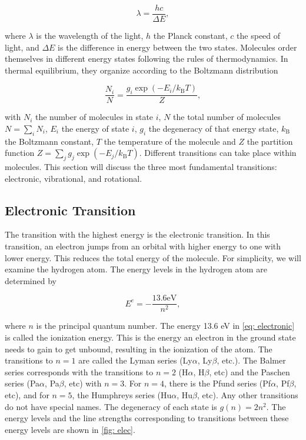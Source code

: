 \documentclass[oneside, single, authoryear, semicolon, 12pt]{lion-msc}
\newcommand{\4}{$_4$}
\newcommand{\3}{$_3$}
\newcommand{\2}{$_2$}
\begin{document}
\begin{equation}
    \lambda=\frac{hc}{\Delta E},
\end{equation}

where $\lambda$ is the wavelength of the light, $h$ the Planck constant, $c$ the speed of light, and $\Delta E$ is the difference in energy between the two states. Molecules order themselves in different energy states following the rules of thermodynamics. In thermal equilibrium, they organize according to the Boltzmann distribution 

\begin{equation}
    \frac{N_i}{N}=\frac{g_i\exp{(-E_i/k_\mathrm{B}T)}}{Z},
    \label{eq: boltzmann}
\end{equation}

with $N_i$ the number of molecules in state $i$, $N$ the total number of molecules $N=\sum_iN_i$, $E_i$ the energy of state $i$, $g_i$ the degeneracy of that energy state, $k_\mathrm{B}$ the Boltzmann constant, $T$ the temperature of the molecule and $Z$ the partition function $Z=\sum_j g_j\exp{(-E_j/k_\mathrm{B}T)}$.
Different transitions can take place within molecules. This section will discuss the three most fundamental transitions: electronic, vibrational, and rotational.

\subsection{Electronic Transition}
The transition with the highest energy is the electronic transition. In this transition, an electron jumps from an orbital with higher energy to one with lower energy. This reduces the total energy of the molecule. For simplicity, we will examine the hydrogen atom. The energy levels in the hydrogen atom are determined by

\begin{equation}
    E^e=-\frac{13.6\mathrm{ eV}}{n^2},
    \label{eq: electronic}
\end{equation}

where $n$ is the principal quantum number. The energy 13.6 eV in \autoref{eq: electronic} is called the ionization energy. This is the energy an electron in the ground state needs to gain to get unbound, resulting in the ionization of the atom. The transitions to $n=1$ are called the Lyman series (Ly$\alpha$, Ly$\beta$, etc.). The Balmer series corresponds with the transitions to $n=2$ (H$\alpha$, H$\beta$, etc) and the Paschen series (Pa$\alpha$, Pa$\beta$, etc) with $n=3$. For $n=4$, there is the Pfund series (Pf$\alpha$, Pf$\beta$, etc), and for $n=5$, the Humphreys series (Hu$\alpha$, Hu$\beta$, etc). Any other transitions do not have special names. The degeneracy of each state is $g(n)=2n^2$. The energy levels and the line strengths corresponding to transitions between these energy levels are shown in \autoref{fig: elec}.
\end{document}
